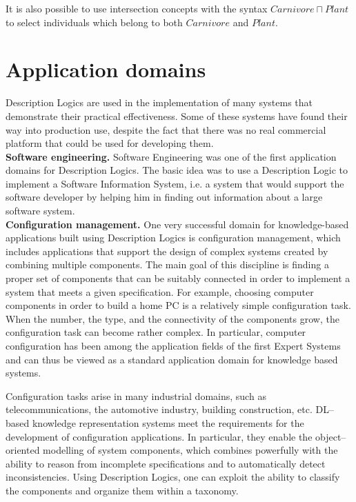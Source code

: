 \documentclass[a4paper, 11pt, oneside]{duthesis}
\begin{document}
It is also possible to use intersection concepts with the syntax $Carnivore \sqcap Plant$ to select individuals which belong to both $Carnivore$ and $Plant$.

\newpage

\section{Application domains}
Description Logics are used in the implementation of many systems that demonstrate their practical effectiveness. Some of these systems have found their way into production use, despite the fact that there was no real commercial platform that could be used for developing them.\\

\textbf{Software engineering.} Software Engineering was one of the first application domains for Description Logics. The basic idea was to use a Description Logic to implement a Software Information System, i.e. a system that would support the software developer by helping him in finding out information about a large software system.\\

\textbf{Configuration management.} One very successful domain for knowledge-based applications built using Description Logics is configuration management, which includes applications that support the design of complex systems created by combining multiple components.
The main goal of this discipline is finding a proper set of components that can be suitably connected in order to implement a system that meets a given specification.
For example, choosing computer components in order to build a home PC is a relatively simple configuration task.
When the number, the type, and the connectivity of the components grow, the configuration task can become rather complex.
In particular, computer configuration has been among the application fields of the first Expert Systems and can thus be viewed as a standard application domain for knowledge based systems.

Configuration tasks arise in many industrial domains, such as telecommunications, the automotive industry, building construction, etc.
DL--based knowledge representation systems meet the requirements for the development of configuration applications.
In particular, they enable the object--oriented modelling of system components, which combines powerfully with the ability to reason from incomplete specifications and to automatically detect inconsistencies.
Using Description Logics, one can exploit the ability to classify the components and organize them within a taxonomy.\\
\end{document}
